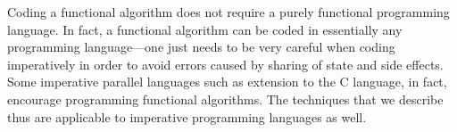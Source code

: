\begin{cluster}
\label{grp:rmrk:language::functional-algorithms::coding}

\begin{remark}
\label{rmrk:language::functional-algorithms::coding}
Coding a functional algorithm does not require a purely
functional programming language.
In fact, a functional algorithm can be coded in essentially any
programming language---one just needs to be very careful when
coding imperatively in order to avoid errors caused by sharing of
state and side effects.  
Some imperative parallel languages such as extension to the C
language, in fact, encourage programming functional algorithms.
The techniques that we describe thus are applicable to  imperative
programming languages as  well.

\end{remark}
\end{cluster}

